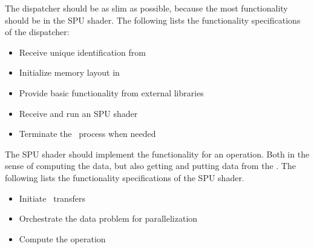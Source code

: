 The dispatcher should be as slim as possible, because the most
functionality should be in the SPU shader. The following lists the
functionality specifications of the dispatcher:

\begin{itemize}
\item{Receive unique identification from \PPE\ }
\item{Initialize memory layout in \LS\ }
\item{Provide basic functionality from external libraries}
\item{Receive and run an SPU shader}
\item{Terminate the \SPE\ process when needed}
\end{itemize}

The SPU shader should implement the functionality for an
operation. Both in the sense of computing the data, but also getting
and putting data from the \PPE{}. The following lists the
functionality specifications of the SPU shader.

\begin{itemize}
\item{Initiate \DMA\ transfers}
\item{Orchestrate the data problem for parallelization}
\item{Compute the operation}
\end{itemize}
